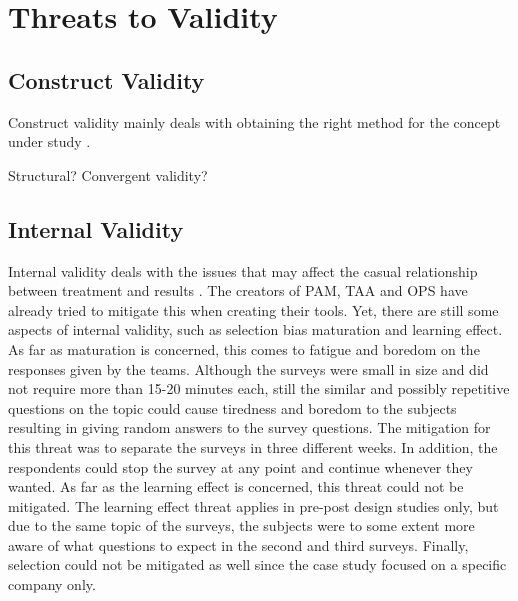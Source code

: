 \section{Threats to Validity}

\subsection{Construct Validity}
Construct validity mainly deals with obtaining the right method for the concept under study \cite{Wohlin}.

Structural?
Convergent validity?

%
%
%
%
%


\subsection{Internal Validity}
Internal validity deals with the issues that may affect the casual relationship between treatment and results \cite{Wohlin}. The creators of \ac{PAM}, \ac{TAA} and \ac{OPS} have already tried to mitigate this when creating their tools. Yet, there are still some aspects of internal validity, such as selection bias maturation and learning effect. As far as maturation is concerned, this comes to fatigue and boredom on the responses given by the teams. Although the surveys were small in size and did not require more than 15-20 minutes each, still the similar and possibly repetitive questions on the topic could cause tiredness and boredom to the subjects resulting in giving random answers to the survey questions. The mitigation for this threat was to separate the surveys in three different weeks. In addition, the respondents could stop the survey at any point and continue whenever they wanted. As far as the learning effect is concerned, this threat could not be mitigated. The learning effect threat applies in pre-post design studies only, but due to the same topic of the surveys, the subjects were to some extent more aware of what questions to expect in the second and third surveys. Finally, selection could not be mitigated as well since the case study focused on a specific company only.

